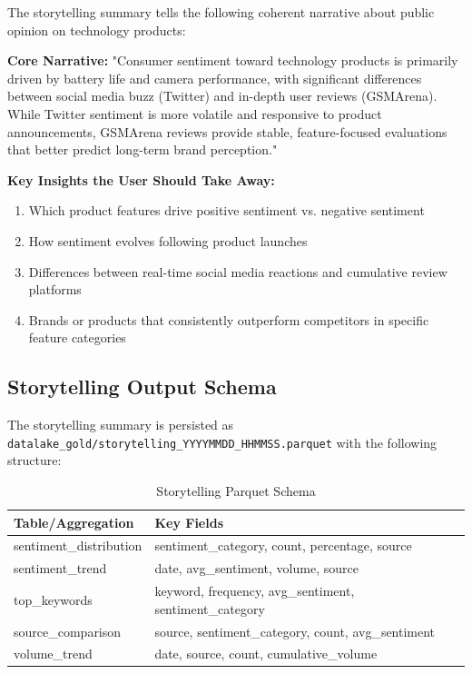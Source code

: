 \documentclass[12pt]{article}
\begin{document}
The storytelling summary tells the following coherent narrative about public opinion on technology products:

\textbf{Core Narrative:} "Consumer sentiment toward technology products is primarily driven by battery life and camera performance, with significant differences between social media buzz (Twitter) and in-depth user reviews (GSMArena). While Twitter sentiment is more volatile and responsive to product announcements, GSMArena reviews provide stable, feature-focused evaluations that better predict long-term brand perception."

\textbf{Key Insights the User Should Take Away:}
\begin{enumerate}
    \item Which product features drive positive sentiment vs. negative sentiment
    \item How sentiment evolves following product launches
    \item Differences between real-time social media reactions and cumulative review platforms
    \item Brands or products that consistently outperform competitors in specific feature categories
\end{enumerate}

\subsection{Storytelling Output Schema}

The storytelling summary is persisted as \texttt{datalake\_gold/storytelling\_YYYYMMDD\_HHMMSS.parquet} with the following structure:

\begin{table}[H]
\centering
\caption{Storytelling Parquet Schema}
\label{tab:storytelling_schema}
\begin{tabular}{p{4cm}p{8cm}}
\toprule
\textbf{Table/Aggregation} & \textbf{Key Fields} \\
\midrule
sentiment\_distribution & sentiment\_category, count, percentage, source \\
sentiment\_trend & date, avg\_sentiment, volume, source \\
top\_keywords & keyword, frequency, avg\_sentiment, sentiment\_category \\
source\_comparison & source, sentiment\_category, count, avg\_sentiment \\
volume\_trend & date, source, count, cumulative\_volume \\
\bottomrule
\end{tabular}
\end{table}
\end{document}
